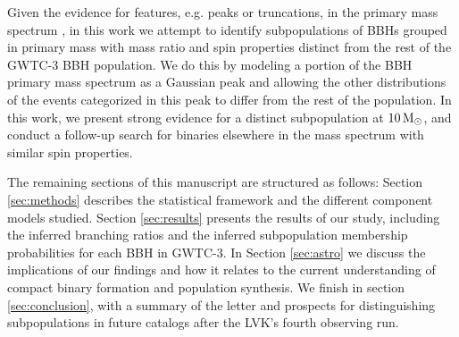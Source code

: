 Given the evidence for features, e.g. peaks or truncations, in the primary mass spectrum \citep{10.3847/2041-8213/aa9bf6, 10.3847/1538-4357/aab34c, 2019ApJ...882L..24A, 2021ApJ...913L...7A, 2023PhRvX..13a1048A,2104.07783v2, 2022ApJ...924..101E, 2022arXiv221012834E,2022ApJ...928..155T, 2301.00834,10.48550/arXiv.2302.07289}, in this work we attempt to identify subpopulations of BBHs grouped in primary mass with mass ratio and spin properties distinct from the rest of the GWTC-3 BBH population. We do this by modeling a portion of the BBH primary mass spectrum as a Gaussian peak and allowing the other distributions of the events categorized in this peak to differ from the rest of the population. In this work, we present strong evidence for a distinct subpopulation at $10 {\,\rm M}_\odot$, and conduct a follow-up search for binaries elsewhere in the mass spectrum with similar spin properties.

The remaining sections of this manuscript are structured as follows: Section \ref{sec:methods} describes the statistical framework and the different component models studied. Section \ref{sec:results} presents the results of our study, including the inferred branching ratios and the inferred subpopulation membership probabilities for each BBH in GWTC-3. In Section \ref{sec:astro} we discuss the implications of our findings and how it relates to the current understanding of compact binary formation and population synthesis. We finish in section \ref{sec:conclusion}, with a summary of the letter and prospects for distinguishing subpopulations in future catalogs after the LVK's fourth observing run.